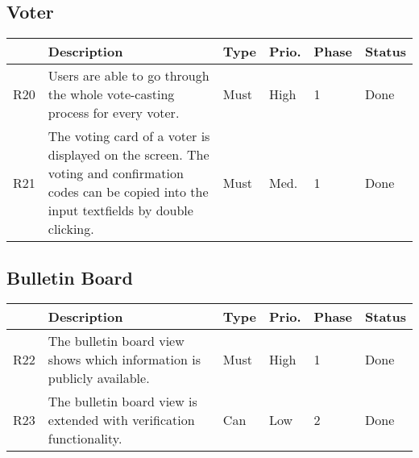 \subsection{Voter}
\begin{longtable}{p{0.5cm}p{9cm}p{1cm}p{1cm}p{1cm}p{1cm}}
\hline
 & Description & Type & Prio. & Phase & Status\\
\hline
R20 & Users are able to go through the whole vote-casting process for every voter. & Must & High & 1 & Done\\
R21 & The voting card of a voter is displayed on the screen. The voting and confirmation codes can be copied into the input textfields by double clicking. & Must & Med. & 1 & Done\\
\end{longtable}


\subsection{Bulletin Board}
\begin{longtable}{p{0.5cm}p{9cm}p{1cm}p{1cm}p{1cm}p{1cm}}
\hline
 & Description & Type & Prio. & Phase & Status\\
\hline
R22 & The bulletin board view shows which information is publicly available. & Must & High & 1 & Done\\
R23 & The bulletin board view is extended with verification functionality. & Can & Low & 2 & Done\\
\end{longtable}


